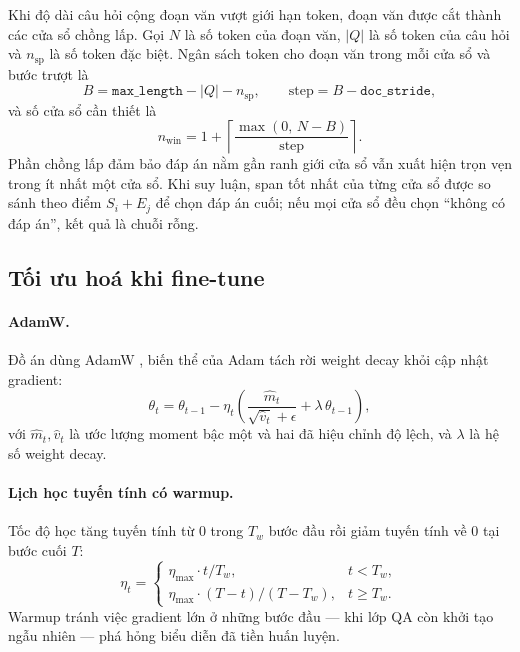 Khi độ dài câu hỏi cộng đoạn văn vượt giới hạn  token, đoạn văn được
cắt thành các cửa sổ chồng lấp. Gọi $N$ là số token của đoạn văn, $|Q|$ là số token của
câu hỏi và $n_{\text{sp}}$ là số token đặc biệt. Ngân sách token cho đoạn văn trong mỗi
cửa sổ và bước trượt là
\begin{equation}
  B = \texttt{max\_length} - |Q| - n_{\text{sp}}, \qquad
  \text{step} = B - \texttt{doc\_stride},
\end{equation}
và số cửa sổ cần thiết là
\begin{equation}
  n_{\text{win}} = 1 + \left\lceil \frac{\max(0,\, N - B)}{\text{step}} \right\rceil .
  \label{eq:nwin}
\end{equation}
Phần chồng lấp  đảm bảo đáp án nằm gần ranh giới cửa sổ vẫn xuất hiện
trọn vẹn trong ít nhất một cửa sổ. Khi suy luận, span tốt nhất của từng cửa sổ được so
sánh theo điểm $S_i + E_j$ để chọn đáp án cuối; nếu mọi cửa sổ đều chọn ``không có đáp
án'', kết quả là chuỗi rỗng.

\subsection{Tối ưu hoá khi fine-tune}
\label{sec:optim}

\paragraph{AdamW.} Đồ án dùng AdamW \cite{loshchilov2019adamw}, biến thể của Adam tách
rời weight decay khỏi cập nhật gradient:
\begin{equation}
  \theta_{t} = \theta_{t-1} - \eta_t \left( \frac{\hat{m}_t}{\sqrt{\hat{v}_t} + \epsilon} + \lambda\, \theta_{t-1} \right),
\end{equation}
với $\hat{m}_t, \hat{v}_t$ là ước lượng moment bậc một và hai đã hiệu chỉnh độ lệch, và
$\lambda$ là hệ số weight decay.

\paragraph{Lịch học tuyến tính có warmup.} Tốc độ học tăng tuyến tính từ 0 trong $T_w$
bước đầu rồi giảm tuyến tính về 0 tại bước cuối $T$:
\begin{equation}
  \eta_t =
  \begin{cases}
    \eta_{\max} \cdot t / T_w, & t < T_w, \\
    \eta_{\max} \cdot (T - t) / (T - T_w), & t \ge T_w.
  \end{cases}
\end{equation}
Warmup tránh việc gradient lớn ở những bước đầu --- khi lớp QA còn khởi tạo ngẫu nhiên
--- phá hỏng biểu diễn đã tiền huấn luyện.

